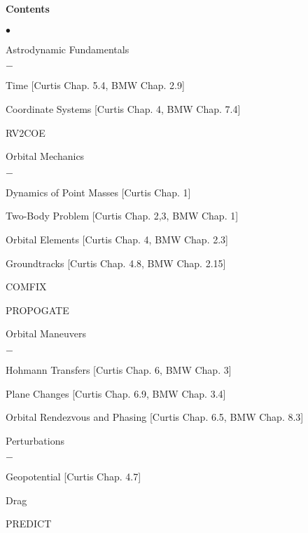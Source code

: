 \documentclass[10pt]{article}
\begin{document}
\paragraph*{Contents}
\begin{list}{$\bullet$}{\setlength{\itemsep}{-3pt}}
\item Astrodynamic Fundamentals
    \begin{list}{$-$}{\setlength{\itemsep}{-3pt}}
    \item Time [Curtis Chap. 5.4, BMW Chap. 2.9]
    \item Coordinate Systems [Curtis Chap. 4, BMW Chap. 7.4]
    \item RV2COE
    \end{list}
\item Orbital Mechanics\vspace*{-0.2cm}
    \begin{list}{$-$}{\setlength{\itemsep}{-3pt}}
    \item Dynamics of Point Masses [Curtis Chap. 1]
    \item Two-Body Problem [Curtis Chap. 2,3, BMW Chap. 1]
    \item Orbital Elements [Curtis Chap. 4, BMW Chap. 2.3]
    \item Groundtracks [Curtis Chap. 4.8, BMW Chap. 2.15]
    \item COMFIX
    \item PROPOGATE
    \end{list}
\item Orbital Maneuvers\vspace*{-0.2cm}
    \begin{list}{$-$}{\setlength{\itemsep}{-3pt}}
    \item Hohmann Transfers [Curtis Chap. 6, BMW Chap. 3]
    \item Plane Changes [Curtis Chap. 6.9, BMW Chap. 3.4]
    \item Orbital Rendezvous and Phasing [Curtis Chap. 6.5, BMW Chap. 8.3]
    \end{list}
\item Perturbations
    \begin{list}{$-$}{\setlength{\itemsep}{-3pt}}
    \item Geopotential [Curtis Chap. 4.7]
    \item Drag
    \item PREDICT
    \end{list}
\end{list}
\end{document}
